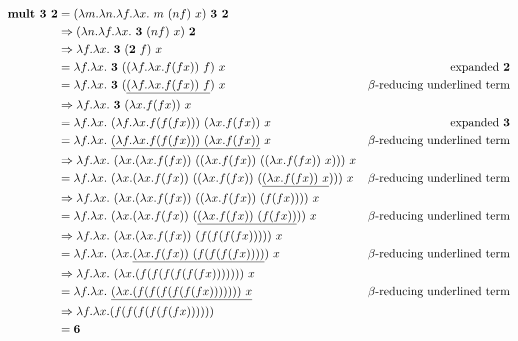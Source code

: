 \documentclass[addpoints]{exam}
\renewcommand{\L}[2]{\lambda #1.#2}
\begin{document}
\begin{questions}
  \begin{solutionbox}{12cm}
  \begin{align*}
    \textbf{mult 3 2} &
     = (\L{m}{\L{n}{\L{f}{\L{x}{~m~(n f)~x}}}})~\textbf{3 2} & \\
    & \Rightarrow (\L{n}{\L{f}{\L{x}{~\textbf{3}~(n f)~x}}})~\textbf{2}\\
    & \Rightarrow \L{f}{\L{x}{~\textbf{3}~(\textbf{2}~f)~x}}\\
    & = \L{f}{\L{x}{~\textbf{3}~((\L{f}{\L{x}{f (f x)}})~f)~x}} & \textrm{expanded \textbf{2}}\\
    & = \L{f}{\L{x}{~\textbf{3}~(\underline{(\L{f}{\L{x}{f (f x)}})~f})~x}} & \textrm{$\beta$-reducing underlined term}\\
    & \Rightarrow \L{f}{\L{x}{~\textbf{3}~(\L{x}{f (f x)})~x}} & \\
    & = \L{f}{\L{x}{~(\L{f}{\L{x}{f (f (f x))}})~(\L{x}{f (f x)})~x}} & \textrm{expanded \textbf{3}}\\
    & = \L{f}{\L{x}{~\underline{(\L{f}{\L{x}{f (f (f x))}})~(\L{x}{f (f x)})}~x}} & \textrm{$\beta$-reducing underlined term}\\
    & \Rightarrow \L{f}{\L{x}{~(\L{x}{(\L{x}{f (f x)})~((\L{x}{f (f x)})~((\L{x}{f (f x)})~x))})~x}} & \\
    & = \L{f}{\L{x}{~(\L{x}{(\L{x}{f (f x)})~((\L{x}{f (f x)})~(\underline{(\L{x}{f (f x)})~x}))})~x}} & \textrm{$\beta$-reducing underlined term}\\
    & \Rightarrow \L{f}{\L{x}{~(\L{x}{(\L{x}{f (f x)})~((\L{x}{f (f x)})~(f (f x)))})~x}} & \\
    & = \L{f}{\L{x}{~(\L{x}{(\L{x}{f (f x)})~(\underline{(\L{x}{f (f x)})~(f (f x))})})~x}} & \textrm{$\beta$-reducing underlined term}\\
    & \Rightarrow \L{f}{\L{x}{~(\L{x}{(\L{x}{f (f x)})~(f (f (f (f x))))})~x}} & \\
    & = \L{f}{\L{x}{~(\L{x}{\underline{(\L{x}{f (f x)})~(f (f (f (f x))))}})~x}} & \textrm{$\beta$-reducing underlined term}\\
    & \Rightarrow \L{f}{\L{x}{~(\L{x}{(f (f (f (f (f (f x))))))})~x}} & \\
    & = \L{f}{\L{x}{~\underline{(\L{x}{(f (f (f (f (f (f x))))))})~x}}} & \textrm{$\beta$-reducing underlined term}\\
    & \Rightarrow \L{f}{\L{x}{(f (f (f (f (f (f x))))))}} & \\
    & = \textbf{6}
  \end{align*}
  \end{solutionbox}



\end{questions}
\end{document}
